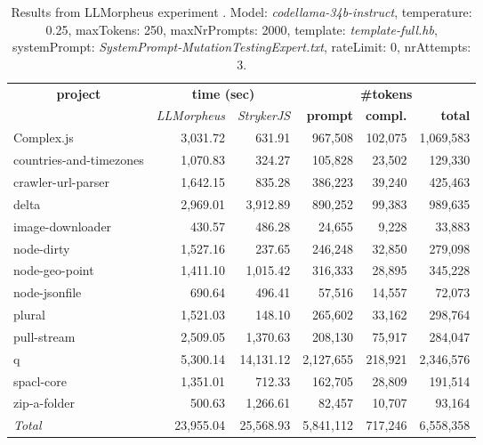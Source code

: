 
\begin{table*}[hbt!]
\centering
{\scriptsize
\begin{tabular}{l||r|r|r|r|r}
\multicolumn{1}{c|}{\bf project} & \multicolumn{2}{|c|}{\bf time (sec)} & \multicolumn{3}{|c|}{\bf \#tokens} \\
               & {\it LLMorpheus} & {\it StrykerJS} & {\bf prompt} & {\bf compl.} & {\bf total} \\
\hline
  Complex.js & 3,031.72 & 631.91 & 967,508 & 102,075 & 1,069,583 \\ 
countries-and-timezones & 1,070.83 & 324.27 & 105,828 & 23,502 & 129,330 \\ 
crawler-url-parser & 1,642.15 & 835.28 & 386,223 & 39,240 & 425,463 \\ 
delta & 2,969.01 & 3,912.89 & 890,252 & 99,383 & 989,635 \\ 
image-downloader & 430.57 & 486.28 & 24,655 & 9,228 & 33,883 \\ 
node-dirty & 1,527.16 & 237.65 & 246,248 & 32,850 & 279,098 \\ 
node-geo-point & 1,411.10 & 1,015.42 & 316,333 & 28,895 & 345,228 \\ 
node-jsonfile & 690.64 & 496.41 & 57,516 & 14,557 & 72,073 \\ 
plural & 1,521.03 & 148.10 & 265,602 & 33,162 & 298,764 \\ 
pull-stream & 2,509.05 & 1,370.63 & 208,130 & 75,917 & 284,047 \\ 
q & 5,300.14 & 14,131.12 & 2,127,655 & 218,921 & 2,346,576 \\ 
spacl-core & 1,351.01 & 712.33 & 162,705 & 28,809 & 191,514 \\ 
zip-a-folder & 500.63 & 1,266.61 & 82,457 & 10,707 & 93,164 \\ 
\hline
  \textit{Total} & 23,955.04 & 25,568.93 & 5,841,112 & 717,246 & 6,558,358 \\
  \end{tabular}
  }
  \\[2mm]
  \caption{Results from LLMorpheus experiment .
    Model: \textit{codellama-34b-instruct}, 
    temperature: 0.25, 
    maxTokens: 250, 
    maxNrPrompts: 2000, 
    template: \textit{template-full.hb}, 
    systemPrompt: \textit{SystemPrompt-MutationTestingExpert.txt}, 
    rateLimit: 0, 
    nrAttempts: 3.  
  }
  \label{table:Cost:run352:codellama-34b-instruct:template-full.hb:0.25}
\end{table*}